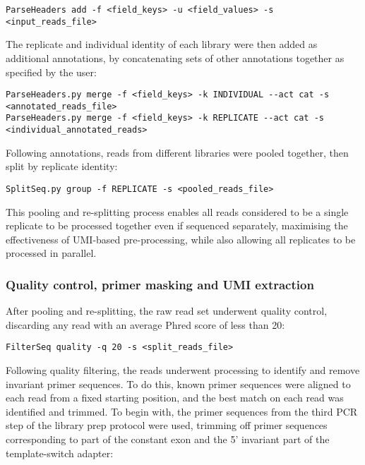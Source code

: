 \begin{lstlisting}
ParseHeaders add -f <field_keys> -u <field_values> -s <input_reads_file>
\end{lstlisting}

\noindent The replicate and individual identity of each library were then added as additional annotations, by concatenating sets of other annotations together as specified by the user:

\begin{lstlisting}
ParseHeaders.py merge -f <field_keys> -k INDIVIDUAL --act cat -s <annotated_reads_file>
ParseHeaders.py merge -f <field_keys> -k REPLICATE --act cat -s <individual_annotated_reads>
\end{lstlisting}

\noindent Following annotations, reads from different libraries were pooled together, then split by replicate identity:

\begin{lstlisting}
SplitSeq.py group -f REPLICATE -s <pooled_reads_file>
\end{lstlisting}

\noindent This pooling and re-splitting process enables all reads considered to be a single replicate to be processed together even if sequenced separately, maximising the effectiveness of UMI-based pre-processing, while also allowing all replicates to be processed in parallel.

\subsubsection{Quality control, primer masking and UMI extraction}
\label{sec:methods_comp_igpreproc_mask}

After pooling and re-splitting, the raw read set underwent quality control, discarding any read with an average Phred score \parencite{ewing1998phred} of less than 20:

\begin{lstlisting}
FilterSeq quality -q 20 -s <split_reads_file>
\end{lstlisting}

\noindent Following quality filtering, the reads underwent processing to identify and remove invariant primer sequences. To do this, known primer sequences were aligned to each read from a fixed starting position, and the best match on each read was identified and trimmed. To begin with, the primer sequences from the third PCR step of the library prep protocol were used, trimming off primer sequences corresponding to part of the constant  exon and the 5' invariant part of the template-switch adapter:

